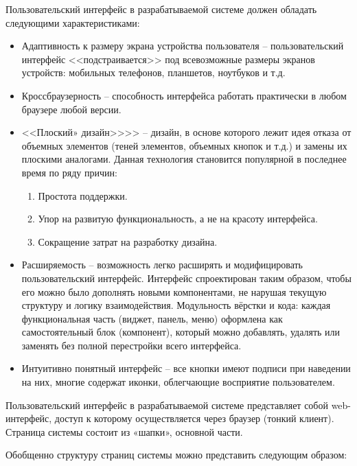 Пользовательский интерфейс в разрабатываемой системе должен обладать следующими характеристиками:
\begin{itemize}
    \item Адаптивность к размеру экрана устройства пользователя -- пользовательский интерфейс <<подстраивается>> под всевозможные размеры экранов устройств: мобильных телефонов, планшетов, ноутбуков и т.д.
    \item Кроссбраузерность -- способность интерфейса работать практически в любом браузере любой версии. 
    \item <<Плоский» дизайн>>>> -- дизайн, в основе которого лежит идея отказа от объемных элементов (теней элементов, объемных кнопок и т.д.) и замены их плоскими аналогами.
    Данная технология становится популярной в последнее время по ряду причин:
    \begin{enumerate}
        \item Простота поддержки.
        \item Упор на развитую функциональность, а не на красоту интерфейса.
        \item Сокращение затрат на разработку дизайна.
    \end{enumerate}
    \item Расширяемость -- возможность легко расширять и модифицировать пользовательский интерфейс. 
    Интерфейс спроектирован таким образом, чтобы его можно было дополнять новыми компонентами, не нарушая текущую структуру и логику взаимодействия.
    Модульность вёрстки и кода: каждая функциональная часть (виджет, панель, меню) оформлена как самостоятельный блок (компонент), который можно добавлять, удалять или заменять без полной перестройки всего интерфейса.
    \item Интуитивно понятный интерфейс -- все кнопки имеют подписи при наведении на них, многие содержат иконки, облегчающие восприятие пользователем.
\end{itemize}

Пользовательский интерфейс в разрабатываемой системе представляет собой web-интерфейс, доступ к которому осуществляется через браузер (тонкий клиент). Страница системы состоит из «шапки», основной части.

Обобщенно структуру страниц системы можно представить следующим образом:

